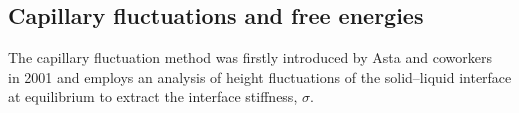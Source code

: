 










\subsection{Capillary fluctuations and free energies\label{sec:CFM}}

The capillary fluctuation method was firstly introduced by Asta and coworkers~\cite{HoytPRL2001:CFM} in 2001 and employs an analysis of height fluctuations
of the solid--liquid interface at equilibrium to extract the interface stiffness, $\sigma$.

